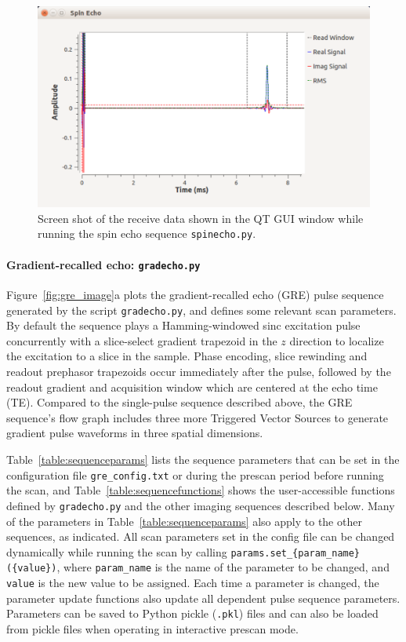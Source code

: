 \documentclass[review]{elsarticle}
\begin{document}
\begin{figure}[!ht]
\begin{center}
\includegraphics[width = 1\textwidth,trim=0 0 0 0,clip=false]{scan_screenshot.png}
\caption{Screen shot of the receive data shown in the QT GUI window while running the spin echo sequence \texttt{spinecho.py}.}
\label{fig:gui}
\end{center}
\end{figure}

\paragraph{Gradient-recalled echo: \texttt{gradecho.py}}
Figure~\ref{fig:gre_image}a plots the gradient-recalled echo (GRE) pulse sequence 
generated by the script \texttt{gradecho.py}, 
and defines some relevant scan parameters.  
By default the sequence plays a Hamming-windowed sinc excitation pulse
concurrently with a slice-select gradient trapezoid in the $z$ direction to localize the excitation to a slice in the sample.
Phase encoding, slice rewinding and readout prephasor trapezoids occur immediately after the pulse,
followed by the readout gradient and acquisition window which are centered at the echo time (TE). 
Compared to the single-pulse sequence described above, 
the GRE sequence's flow graph includes three more Triggered Vector Sources to generate 
gradient pulse waveforms in three spatial dimensions.

\par Table~\ref{table:sequenceparams} lists the sequence parameters that can be set in the configuration file
\texttt{gre\_config.txt} or during the prescan period before running the scan, 
and Table~\ref{table:sequencefunctions} shows the user-accessible functions defined by \texttt{gradecho.py}
and the other imaging sequences described below.  
Many of the parameters in Table~\ref{table:sequenceparams} also apply to the other sequences,
as indicated. 
All scan parameters set in the config file can be changed dynamically while running the scan by calling \texttt{params.set\_\{param\_name\}(\{value\})}, where \texttt{param\_name} is the name of the parameter to be changed, 
and \texttt{value} is the new value to be assigned.
Each time a parameter is changed, the parameter update functions also update all dependent pulse sequence parameters.
Parameters can be saved to Python pickle (\texttt{.pkl}) files and can also be loaded from pickle files when operating in interactive prescan mode.
\end{document}
